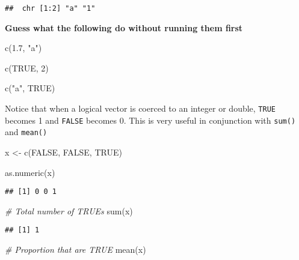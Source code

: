 \documentclass[
]{book}
\newenvironment{Shaded}{\begin{snugshade}}{\end{snugshade}}
\newcommand{\CommentTok}[1]{\textcolor[rgb]{0.56,0.35,0.01}{\textit{#1}}}
\newcommand{\ConstantTok}[1]{\textcolor[rgb]{0.00,0.00,0.00}{#1}}
\newcommand{\DecValTok}[1]{\textcolor[rgb]{0.00,0.00,0.81}{#1}}
\newcommand{\FloatTok}[1]{\textcolor[rgb]{0.00,0.00,0.81}{#1}}
\newcommand{\FunctionTok}[1]{\textcolor[rgb]{0.00,0.00,0.00}{#1}}
\newcommand{\NormalTok}[1]{#1}
\newcommand{\OtherTok}[1]{\textcolor[rgb]{0.56,0.35,0.01}{#1}}
\newcommand{\StringTok}[1]{\textcolor[rgb]{0.31,0.60,0.02}{#1}}
\begin{document}
\begin{verbatim}
##  chr [1:2] "a" "1"
\end{verbatim}

\textbf{Guess what the following do without running them first}

\begin{Shaded}
\begin{Highlighting}[]
\FunctionTok{c}\NormalTok{(}\FloatTok{1.7}\NormalTok{, }\StringTok{"a"}\NormalTok{)}

\FunctionTok{c}\NormalTok{(}\ConstantTok{TRUE}\NormalTok{, }\DecValTok{2}\NormalTok{)}

\FunctionTok{c}\NormalTok{(}\StringTok{"a"}\NormalTok{, }\ConstantTok{TRUE}\NormalTok{)}
\end{Highlighting}
\end{Shaded}

Notice that when a logical vector is coerced to an integer or double, \texttt{TRUE} becomes 1 and \texttt{FALSE} becomes 0. This is very useful in conjunction with \texttt{sum()} and \texttt{mean()}

\begin{Shaded}
\begin{Highlighting}[]
\NormalTok{x }\OtherTok{\textless{}{-}} \FunctionTok{c}\NormalTok{(}\ConstantTok{FALSE}\NormalTok{, }\ConstantTok{FALSE}\NormalTok{, }\ConstantTok{TRUE}\NormalTok{)}

\FunctionTok{as.numeric}\NormalTok{(x)}
\end{Highlighting}
\end{Shaded}

\begin{verbatim}
## [1] 0 0 1
\end{verbatim}

\begin{Shaded}
\begin{Highlighting}[]
\CommentTok{\# Total number of TRUEs}
\FunctionTok{sum}\NormalTok{(x)}
\end{Highlighting}
\end{Shaded}

\begin{verbatim}
## [1] 1
\end{verbatim}

\begin{Shaded}
\begin{Highlighting}[]
\CommentTok{\# Proportion that are TRUE}
\FunctionTok{mean}\NormalTok{(x)}
\end{Highlighting}
\end{Shaded}
\end{document}
